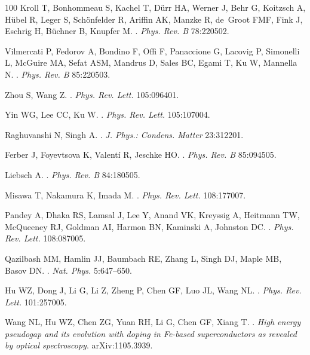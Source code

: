 \documentclass[]{ar2e-changed}%
\begin{document}
\begin{thebibliography}{100}
Kroll T, Bonhommeau S, Kachel T, D\"urr HA, Werner J, Behr G, Koitzsch A,
  H\"ubel R, Leger S, Sch\"onfelder R, Ariffin AK, Manzke R, de~Groot FMF, Fink
  J, Eschrig H, B\"uchner B, Knupfer M.
.
\newblock \emph{Phys. Rev. B} 78:220502.

Vilmercati P, Fedorov A, Bondino F, Offi F, Panaccione G, Lacovig P, Simonelli
  L, McGuire MA, Sefat ASM, Mandrus D, Sales BC, Egami T, Ku W, Mannella N.
.
\newblock \emph{Phys. Rev. B} 85:220503.

Zhou S, Wang Z.
.
\newblock \emph{Phys. Rev. Lett.} 105:096401.

Yin WG, Lee CC, Ku W.
.
\newblock \emph{Phys. Rev. Lett.} 105:107004.

Raghuvanshi N, Singh A.
.
\newblock \emph{J. Phys.: Condens. Matter} 23:312201.

Ferber J, Foyevtsova K, Valent\'i R, Jeschke HO.
.
\newblock \emph{Phys. Rev. B} 85:094505.

Liebsch A.
.
\newblock \emph{Phys. Rev. B} 84:180505.

Misawa T, Nakamura K, Imada M.
.
\newblock \emph{Phys. Rev. Lett.} 108:177007.

Pandey A, Dhaka RS, Lamsal J, Lee Y, Anand VK, Kreyssig A, Heitmann TW,
  McQueeney RJ, Goldman AI, Harmon BN, Kaminski A, Johnston DC.
.
\newblock \emph{Phys. Rev. Lett.} 108:087005.

Qazilbash MM, Hamlin JJ, Baumbach RE, Zhang L, Singh DJ, Maple MB, Basov DN.
.
\newblock \emph{Nat. Phys.} 5:647--650.

Hu WZ, Dong J, Li G, Li Z, Zheng P, Chen GF, Luo JL, Wang NL.
.
\newblock \emph{Phys. Rev. Lett.} 101:257005.

{Wang} NL, {Hu} WZ, {Chen} ZG, {Yuan} RH, {Li} G, {Chen} GF, {Xiang} T.
.
\newblock \emph{{High energy pseudogap and its evolution with doping in
  Fe-based superconductors as revealed by optical spectroscopy}}.
\newblock arXiv:1105.3939.


\end{thebibliography}
\end{document}
